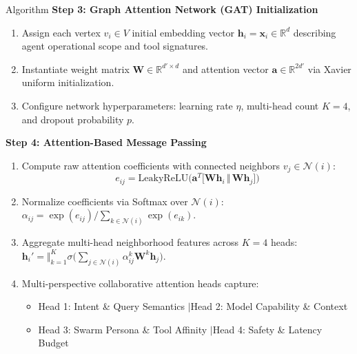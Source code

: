 \documentclass[aspectratio=169,10pt]{beamer}
\begin{document}
\begin{frame}[t]{Algorithm}
  \vspace{0.15em}
  {\large\bfseries\color{lavenderDark}Step 3: Graph Attention Network (GAT) Initialization}
  \vspace{0.15em}
  \begin{enumerate}\setlength{\itemsep}{1.2pt}\small
    \item Assign each vertex $v_i \in V$ initial embedding vector $\mathbf{h}_i = \mathbf{x}_i \in \mathbb{R}^d$ describing agent operational scope and tool signatures.
    \item Instantiate weight matrix $\mathbf{W} \in \mathbb{R}^{d' \times d}$ and attention vector $\mathbf{a} \in \mathbb{R}^{2d'}$ via Xavier uniform initialization.
    \item Configure network hyperparameters: learning rate $\eta$, multi-head count $K=4$, and dropout probability $p$.
  \end{enumerate}
  \vspace{0.35em}
  {\large\bfseries\color{lavenderDark}Step 4: Attention-Based Message Passing}
  \vspace{0.15em}
  \begin{enumerate}\setlength{\itemsep}{1.2pt}\small
    \item Compute raw attention coefficients with connected neighbors $v_j \in \mathcal{N}(i)$:
      $$e_{ij} = \mathrm{LeakyReLU}\Big(\mathbf{a}^T \big[\mathbf{W} \mathbf{h}_i \,\Vert\, \mathbf{W} \mathbf{h}_j\big]\Big)$$
      \vspace{-0.3em}
    \item Normalize coefficients via Softmax over $\mathcal{N}(i)$: $\alpha_{ij} = \exp(e_{ij}) / \sum_{k \in \mathcal{N}(i)} \exp(e_{ik})$.
    \item Aggregate multi-head neighborhood features across $K=4$ heads: $\mathbf{h}_i' = \Vert_{k=1}^K \sigma\big(\sum_{j \in \mathcal{N}(i)} \alpha_{ij}^k \mathbf{W}^k \mathbf{h}_j\big)$.
    \item Multi-perspective collaborative attention heads capture:
      \begin{itemize}\setlength{\itemsep}{1pt}
        \item Head 1: Intent \& Query Semantics \quad$\vert$\quad Head 2: Model Capability \& Context
        \item Head 3: Swarm Persona \& Tool Affinity \quad$\vert$\quad Head 4: Safety \& Latency Budget
      \end{itemize}
  \end{enumerate}
\end{frame}
\end{document}
